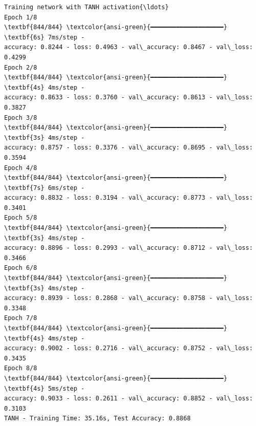 \documentclass[11pt]{article}
\begin{document}
\begin{Verbatim}[commandchars=\\\{\}]
Training network with TANH activation{\ldots}
Epoch 1/8
\textbf{844/844} \textcolor{ansi-green}{━━━━━━━━━━━━━━━━━━━━} \textbf{6s} 7ms/step -
accuracy: 0.8244 - loss: 0.4963 - val\_accuracy: 0.8467 - val\_loss: 0.4299
Epoch 2/8
\textbf{844/844} \textcolor{ansi-green}{━━━━━━━━━━━━━━━━━━━━} \textbf{4s} 4ms/step -
accuracy: 0.8633 - loss: 0.3760 - val\_accuracy: 0.8613 - val\_loss: 0.3827
Epoch 3/8
\textbf{844/844} \textcolor{ansi-green}{━━━━━━━━━━━━━━━━━━━━} \textbf{3s} 4ms/step -
accuracy: 0.8757 - loss: 0.3376 - val\_accuracy: 0.8695 - val\_loss: 0.3594
Epoch 4/8
\textbf{844/844} \textcolor{ansi-green}{━━━━━━━━━━━━━━━━━━━━} \textbf{7s} 6ms/step -
accuracy: 0.8832 - loss: 0.3194 - val\_accuracy: 0.8773 - val\_loss: 0.3401
Epoch 5/8
\textbf{844/844} \textcolor{ansi-green}{━━━━━━━━━━━━━━━━━━━━} \textbf{3s} 4ms/step -
accuracy: 0.8896 - loss: 0.2993 - val\_accuracy: 0.8712 - val\_loss: 0.3466
Epoch 6/8
\textbf{844/844} \textcolor{ansi-green}{━━━━━━━━━━━━━━━━━━━━} \textbf{3s} 4ms/step -
accuracy: 0.8939 - loss: 0.2868 - val\_accuracy: 0.8758 - val\_loss: 0.3348
Epoch 7/8
\textbf{844/844} \textcolor{ansi-green}{━━━━━━━━━━━━━━━━━━━━} \textbf{4s} 4ms/step -
accuracy: 0.9002 - loss: 0.2716 - val\_accuracy: 0.8752 - val\_loss: 0.3435
Epoch 8/8
\textbf{844/844} \textcolor{ansi-green}{━━━━━━━━━━━━━━━━━━━━} \textbf{4s} 5ms/step -
accuracy: 0.9033 - loss: 0.2611 - val\_accuracy: 0.8852 - val\_loss: 0.3103
TANH - Training Time: 35.16s, Test Accuracy: 0.8868
    \end{Verbatim}
\end{document}
